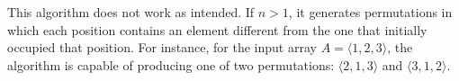 This algorithm does not work as intended.
If $n>1$, it generates permutations in which each position contains an element different from the one that initially occupied that position.
For instance, for the input array $A=\langle1,2,3\rangle$, the algorithm is capable of producing one of two permutations: $\langle2,1,3\rangle$ and $\langle3,1,2\rangle$.
